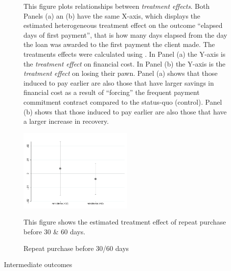 \documentclass[oneside,11pt]{article}
\begin{document}
\begin{figure}[H]
\begin{center}
    \end{center}
       \scriptsize 
       This figure plots relationships between \textit{treatment effects}. Both Panels (a) an (b) have the same X-axis, which displays the estimated heterogeneous treatment effect on the outcome ``elapsed days of first payment'', that is how many days elapsed from the day the loan was awarded to the first payment the client made. The treatments effects were calculated using \cite{atheygrf}. In Panel (a) the Y-axis is the \textit{treatment effect} on financial cost. In Panel (b) the Y-axis is the \textit{treatment effect} on losing their pawn. Panel (a) shows that those induced to pay earlier are also those that have larger savings in financial cost as a result of ``forcing'' the frequent payment commitment contract compared to the status-quo (control). Panel (b) shows that those induced to pay earlier are also those that have a larger increase in recovery.
\end{figure}

\begin{figure}[H]
        \caption{Repeat purchase before 30/60 days}
    \label{reincidence_before}
    \begin{center}
        \centering
        \includegraphics[width=0.50\textwidth]{Figuras/re_te_earlydays.pdf}
    \end{center}
     \scriptsize This figure shows the estimated treatment effect of repeat purchase before 30 \& 60 days.
\end{figure}


\newpage

\begin{table}[H]
\caption{Intermediate outcomes}
\label{mechanisms}
\begin{center}
\scriptsize{}
\end{center}

\end{table}
\end{document}
